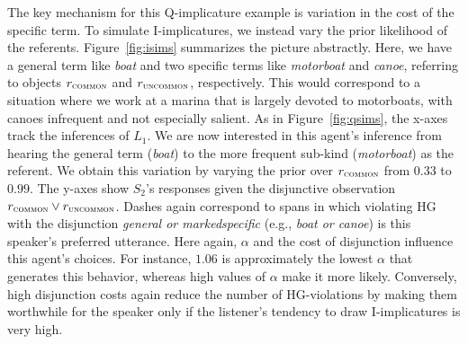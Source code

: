 \documentclass[12pt,twoside]{article}
\newcommand{\Figref}[1]{Figure~\ref{#1}}
\newcommand{\figref}[1]{Figure~\ref{#1}}
\newcommand{\word}[1]{\emph{#1}}
\newcommand{\SpeakerK}[1][k]{S_{#1}}
\newcommand{\ListenerK}[1][k]{L_{#1}}
\renewcommand{\_}{\textbf{\textunderscore\hspace{-4pt}\textunderscore\hspace{-3pt}\textunderscore\hspace{-4pt}\textunderscore}\hspace{0.5pt}}			%
\begin{document}
The key mechanism for this Q-implicature example is variation in the
cost of the specific term. To simulate I-implicatures, we instead vary
the prior likelihood of the referents. \Figref{fig:isims} summarizes
the picture abstractly. Here, we have a general term like \word{boat}
and two specific terms like \word{motorboat} and \word{canoe},
referring to objects $r_{\textsc{common}}$ and
$r_{\textsc{uncommon}}$, respectively. This would correspond to a
situation where we work at a marina that is largely devoted to
motorboats, with canoes infrequent and not especially salient. As in
\figref{fig:qsims}, the x-axes track the inferences of
$\ListenerK[1]$. We are now interested in this agent's inference from
hearing the general term (\word{boat}) to the more frequent sub-kind
(\word{motorboat}) as the referent. We obtain this variation by
varying the prior over $r_{\textsc{common}}$ from $0.33$ to $0.99$.
The y-axes show $\SpeakerK[2]$'s responses given the disjunctive
observation $r_{\textsc{common}} \vee r_{\textsc{uncommon}}$. Dashes
again correspond to spans in which violating HG with the disjunction
\word{general or marked\_specific} (e.g., \word{boat or canoe}) is
this speaker's preferred utterance. Here again, $\alpha$ and the cost
of disjunction influence this agent's choices.  For instance, $1.06$
is approximately the lowest $\alpha$ that generates this behavior,
whereas high values of $\alpha$ make it more likely. Conversely, high
disjunction costs again reduce the number of HG-violations by making
them worthwhile for the speaker only if the listener's tendency to
draw I-implicatures is very high.
\end{document}
